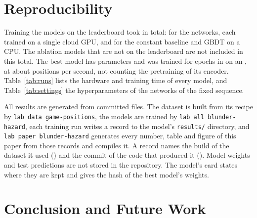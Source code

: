 \documentclass[11pt]{article}
\begin{document}
\section{Reproducibility}
\label{sec:cost}

Training the  models on the leaderboard took 
in total:  for the networks, each trained on a
single cloud GPU, and  for the constant baseline and
GBDT on a CPU. The ablation models that are not on the leaderboard are not
included in this total. The best model has  parameters and
was trained for  epochs in  on an
, at about  positions per second, not
counting the pretraining of its encoder. Table~\ref{tab:runs} lists
the hardware and training time of every model, and
Table~\ref{tab:settings} the hyperparameters of the networks of the fixed
sequence.

All results are generated from committed files. The dataset is built from
its recipe by \texttt{lab data game-positions}, the models are trained by
\texttt{lab all blunder-hazard}, each training run writes a record to the
model's \texttt{results/} directory, and
\texttt{lab paper blunder-hazard} generates every number, table and figure
of this paper from those records and compiles it. A record names the build
of the dataset it used () and the commit of the code
that produced it (). Model weights and test predictions are
not stored in the repository. The model's card states where they are kept
and gives the hash of the best model's weights.

\section{Conclusion and Future Work}
\label{sec:conclusion}
\end{document}
